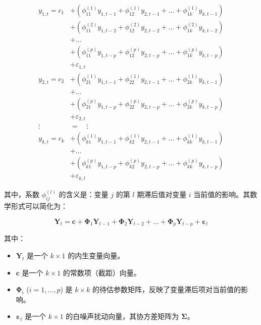 \begin{equation}
\begin{aligned}
y_{1,t} = c_1 &+ \left( \phi_{11}^{(1)} y_{1,t-1} + \phi_{12}^{(1)} y_{2,t-1} + \dots + \phi_{1k}^{(1)} y_{k,t-1} \right) \\
              &+ \left( \phi_{11}^{(2)} y_{1,t-2} + \phi_{12}^{(2)} y_{2,t-2} + \dots + \phi_{1k}^{(2)} y_{k,t-2} \right) \\
              &+ \dots \\
              &+ \left( \phi_{11}^{(p)} y_{1,t-p} + \phi_{12}^{(p)} y_{2,t-p} + \dots + \phi_{1k}^{(p)} y_{k,t-p} \right) \\
              &+ \varepsilon_{1,t} \\
y_{2,t} = c_2 &+ \left( \phi_{21}^{(1)} y_{1,t-1} + \phi_{22}^{(1)} y_{2,t-1} + \dots + \phi_{2k}^{(1)} y_{k,t-1} \right) \\
              &+ \dots \\
              &+ \left( \phi_{21}^{(p)} y_{1,t-p} + \phi_{22}^{(p)} y_{2,t-p} + \dots + \phi_{2k}^{(p)} y_{k,t-p} \right) \\
              &+ \varepsilon_{2,t} \\
\vdots \quad &= \quad \vdots \\
y_{k,t} = c_k &+ \left( \phi_{k1}^{(1)} y_{1,t-1} + \phi_{k2}^{(1)} y_{2,t-1} + \dots + \phi_{kk}^{(1)} y_{k,t-1} \right) \\
              &+ \dots \\
              &+ \left( \phi_{k1}^{(p)} y_{1,t-p} + \phi_{k2}^{(p)} y_{2,t-p} + \dots + \phi_{kk}^{(p)} y_{k,t-p} \right) \\
              &+ \varepsilon_{k,t}
\end{aligned}
\end{equation}

其中，系数 $\phi_{ij}^{(l)}$ 的含义是：变量 $j$ 的第 $l$ 期滞后值对变量 $i$ 当前值的影响。其数学形式可以简化为：

\begin{equation}
\mathbf{Y}_t = \mathbf{c} + \mathbf{\Phi}_1 \mathbf{Y}_{t-1} + \mathbf{\Phi}_2 \mathbf{Y}_{t-2} + \dots + \mathbf{\Phi}_p \mathbf{Y}_{t-p} + \boldsymbol{\varepsilon}_t
\end{equation}

其中：
\begin{itemize}
    \item $\mathbf{Y}_t$ 是一个 $k \times 1$ 的内生变量向量。
    \item $\mathbf{c}$ 是一个 $k \times 1$ 的常数项（截距）向量。
    \item $\mathbf{\Phi}_i$ ($i=1, \dots, p$) 是 $k \times k$ 的待估参数矩阵，反映了变量滞后项对当前值的影响。
    \item $\boldsymbol{\varepsilon}_t$ 是一个 $k \times 1$ 的白噪声扰动向量，其协方差矩阵为 $\mathbf{\Sigma}$。
\end{itemize}

